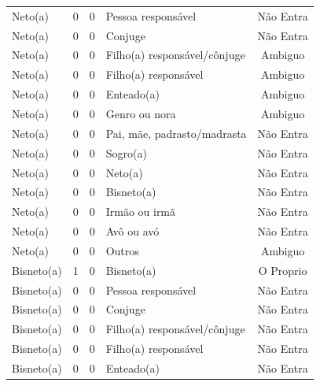 \documentclass[
	12pt,				%
	openright,			%
	twoside,			%
	a4paper,			%
	english,			%
	french,				%
	spanish,			%
	brazil				%
	]{abntex2}
\begin{document}
\begin{anexosenv}
\begin{longtable}{@{}lcclc@{}}
Neto(a)                      & 0         & 0        & Pessoa responsável           & Não Entra       \\
Neto(a)                      & 0         & 0        & Conjuge                      & Não Entra       \\
Neto(a)                      & 0         & 0        & Filho(a) responsável/cônjuge & Ambiguo         \\
Neto(a)                      & 0         & 0        & Filho(a) responsável         & Ambiguo         \\
Neto(a)                      & 0         & 0        & Enteado(a)                   & Ambiguo         \\
Neto(a)                      & 0         & 0        & Genro ou nora                & Ambiguo         \\
Neto(a)                      & 0         & 0        & Pai, mãe, padrasto/madrasta  & Não Entra       \\
Neto(a)                      & 0         & 0        & Sogro(a)                     & Não Entra       \\
Neto(a)                      & 0         & 0        & Neto(a)                      & Não Entra       \\
Neto(a)                      & 0         & 0        & Bisneto(a)                   & Não Entra       \\
Neto(a)                      & 0         & 0        & Irmão ou irmã                & Não Entra       \\
Neto(a)                      & 0         & 0        & Avô ou avó                   & Não Entra       \\
Neto(a)                      & 0         & 0        & Outros                       & Ambiguo         \\
Bisneto(a)                   & 1         & 0        & Bisneto(a)                   & O Proprio       \\
Bisneto(a)                   & 0         & 0        & Pessoa responsável           & Não Entra       \\
Bisneto(a)                   & 0         & 0        & Conjuge                      & Não Entra       \\
Bisneto(a)                   & 0         & 0        & Filho(a) responsável/cônjuge & Não Entra       \\
Bisneto(a)                   & 0         & 0        & Filho(a) responsável         & Não Entra       \\
Bisneto(a)                   & 0         & 0        & Enteado(a)                   & Não Entra       \\

\end{longtable}
\end{anexosenv}
\end{document}
